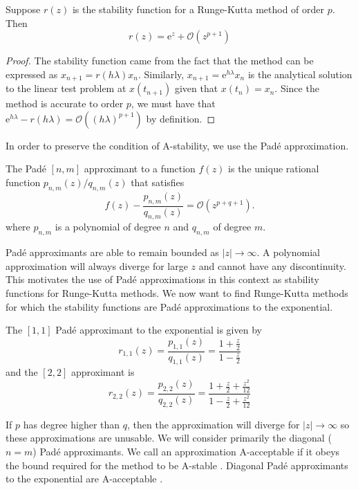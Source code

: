 \begin{lemma}
	\label{lem:stabrkisexp}
	Suppose $r(z)$ is the stability function for a Runge-Kutta method of order $p$. Then
	\begin{equation*}
		r(z) = \mathrm{e}^z + \mathcal{O}(z^{p+1})
	\end{equation*}
\end{lemma}
\begin{proof}
	The stability function came from the fact that the method can be expressed as $x_{n+1} = r(h \lambda) x_n$.
	Similarly, $x_{n+1} = \mathrm{e}^{h \lambda} x_n$ is the analytical solution to the linear test problem at $x(t_{n+1})$ given that $x(t_n) = x_n$.
	Since the method is accurate to order $p$, we must have that $\mathrm{e}^{h \lambda} - r(h \lambda) = \mathcal{O}((h \lambda)^{p+1})$ by definition.
\end{proof}
In order to preserve the condition of A-stability, we use the Pad\'e approximation.
\begin{definition}
	The Pad\'e $[n,m]$ approximant to a function $f(z)$ is the unique rational function $p_{n,m}(z)/q_{n,m}(z)$ that satisfies
	\begin{equation*}
		f(z) - \frac{p_{n,m}(z)}{q_{n,m}(z)} = \mathcal{O}(z^{p+q+1}).
	\end{equation*}
	where $p_{n,m}$ is a polynomial of degree $n$ and $q_{n,m}$ of degree $m$.
\end{definition}
Pad\'e approximants are able to remain bounded as $|z| \rightarrow \infty$. %
A polynomial approximation will always diverge for large $z$ and cannot have any discontinuity.
This motivates the use of Pad\'e approximations in this context as stability functions for Runge-Kutta methods.
We now want to find Runge-Kutta methods for which the stability functions are Pad\'e approximations to the exponential.
\begin{remark}
	The $[1,1]$ Pad\'e approximant to the exponential is given by
	\begin{equation*}
		r_{1,1}(z) = \frac{p_{1,1}(z)}{q_{1,1}(z)} = \frac{1 + \frac{z}{2}}{1 - \frac{z}{2}}
	\end{equation*}
	and the $[2,2]$ approximant is
	\begin{equation*}
		r_{2,2}(z) = \frac{p_{2,2}(z)}{q_{2,2}(z)} = \frac{1 + \frac{z}{2} + \frac{z^2}{12}}{1 - \frac{z}{2} + \frac{z^2}{12}}
	\end{equation*}
\end{remark}
If $p$ has degree higher than $q$, then the approximation will diverge for $|z| \rightarrow \infty$ so these approximations are unusable.
We will consider primarily the diagonal ($n=m$) Pad\'e approximants.
We call an approximation A-acceptable if it obeys the bound required for the method to be A-stable \cite{iserles2009rk}.
Diagonal Pad\'e approximants to the exponential are A-acceptable \cite{wanner1978order}.

